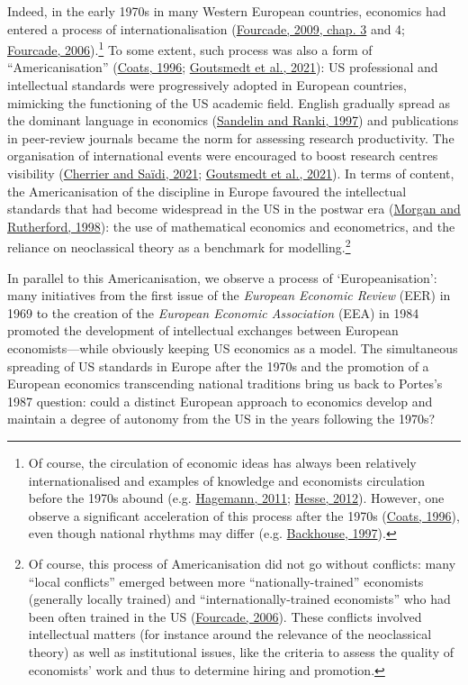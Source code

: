 \documentclass[
  12pt,
  onecolumn]{article}
\begin{document}
Indeed, in the early 1970s in many Western European countries, economics
had entered a process of internationalisation
(\protect\hyperlink{ref-fourcade2009}{Fourcade, 2009, chap. 3} and 4;
\protect\hyperlink{ref-fourcade2006}{Fourcade, 2006}).\footnote{Of
  course, the circulation of economic ideas has always been relatively
  internationalised and examples of knowledge and economists circulation
  before the 1970s abound (e.g.
  \protect\hyperlink{ref-hagemann2011a}{Hagemann, 2011};
  \protect\hyperlink{ref-hesse2012}{Hesse, 2012}). However, one observe
  a significant acceleration of this process after the 1970s
  (\protect\hyperlink{ref-coats1996}{Coats, 1996}), even though national
  rhythms may differ (e.g.
  \protect\hyperlink{ref-backhouse1997a}{Backhouse, 1997}).} To some
extent, such process was also a form of ``Americanisation''
(\protect\hyperlink{ref-coats1996}{Coats, 1996};
\protect\hyperlink{ref-goutsmedt2021}{Goutsmedt et al., 2021}): US
professional and intellectual standards were progressively adopted in
European countries, mimicking the functioning of the US academic field.
English gradually spread as the dominant language in economics
(\protect\hyperlink{ref-sandelin1997}{Sandelin and Ranki, 1997}) and
publications in peer-review journals became the norm for assessing
research productivity. The organisation of international events were
encouraged to boost research centres visibility
(\protect\hyperlink{ref-cherrier2021}{Cherrier and Saïdi, 2021};
\protect\hyperlink{ref-goutsmedt2021}{Goutsmedt et al., 2021}). In terms
of content, the Americanisation of the discipline in Europe favoured the
intellectual standards that had become widespread in the US in the
postwar era (\protect\hyperlink{ref-morgan1998}{Morgan and Rutherford,
1998}): the use of mathematical economics and econometrics, and the
reliance on neoclassical theory as a benchmark for modelling.\footnote{Of
  course, this process of Americanisation did not go without conflicts:
  many ``local conflicts'' emerged between more ``nationally-trained''
  economists (generally locally trained) and ``internationally-trained
  economists'' who had been often trained in the US
  (\protect\hyperlink{ref-fourcade2006}{Fourcade, 2006}). These
  conflicts involved intellectual matters (for instance around the
  relevance of the neoclassical theory) as well as institutional issues,
  like the criteria to assess the quality of economists' work and thus
  to determine hiring and promotion.}

In parallel to this Americanisation, we observe a process of
`Europeanisation': many initiatives from the first issue of the
\emph{European Economic Review} (EER) in 1969 to the creation of the
\emph{European Economic Association} (EEA) in 1984 promoted the
development of intellectual exchanges between European
economists---while obviously keeping US economics as a model. The
simultaneous spreading of US standards in Europe after the 1970s and the
promotion of a European economics transcending national traditions bring
us back to Portes's 1987 question: could a distinct European approach to
economics develop and maintain a degree of autonomy from the US in the
years following the 1970s?
\end{document}
